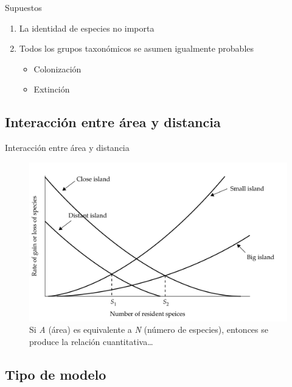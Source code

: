 \documentclass[
  11pt,
  ignorenonframetext,
]{beamer}
\begin{document}
\begin{frame}{Supuestos}
\begin{enumerate}
\item
  La identidad de especies no importa
\item
  Todos los grupos taxonómicos se asumen igualmente probables

  \begin{itemize}
  \item
    Colonización
  \item
    Extinción
  \end{itemize}
\end{enumerate}
\end{frame}

\hypertarget{interacciuxf3n-entre-uxe1rea-y-distancia}{%
\subsection{Interacción entre área y
distancia}\label{interacciuxf3n-entre-uxe1rea-y-distancia}}

\begin{frame}{Interacción entre área y distancia}
\begin{figure}
\centering
\includegraphics{Biogeografia/Distancia.Area.png}
\caption{Si \emph{A} (área) es equivalente a \emph{N} (número de
especies), entonces se produce la relación cuantitativa\ldots{}}
\end{figure}
\end{frame}

\hypertarget{tipo-de-modelo}{%
\subsection{Tipo de modelo}\label{tipo-de-modelo}}
\end{document}
